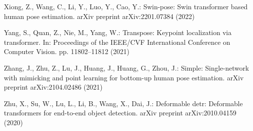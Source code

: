 \documentclass[runningheads]{llncs}
\begin{document}
\begin{thebibliography}{10}
Xiong, Z., Wang, C., Li, Y., Luo, Y., Cao, Y.: Swin-pose: Swin transformer
  based human pose estimation. arXiv preprint arXiv:2201.07384  (2022)

Yang, S., Quan, Z., Nie, M., Yang, W.: Transpose: Keypoint localization via
  transformer. In: Proceedings of the IEEE/CVF International Conference on
  Computer Vision. pp. 11802--11812 (2021)

Zhang, J., Zhu, Z., Lu, J., Huang, J., Huang, G., Zhou, J.: Simple:
  Single-network with mimicking and point learning for bottom-up human pose
  estimation. arXiv preprint arXiv:2104.02486  (2021)

Zhu, X., Su, W., Lu, L., Li, B., Wang, X., Dai, J.: Deformable detr: Deformable
  transformers for end-to-end object detection. arXiv preprint arXiv:2010.04159
   (2020)

\end{thebibliography}
\end{document}
